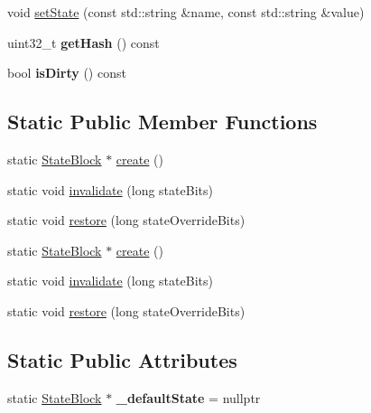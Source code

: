 \begin{DoxyCompactItemize}
\item 
void \hyperlink{classRenderState_1_1StateBlock_a2c2c0261c33ec94e36ec97d879179118}{set\+State} (const std\+::string \&name, const std\+::string \&value)
\item 
\mbox{\label{classRenderState_1_1StateBlock_ad1160751d0b0039ade6f575392c8a735}} 
uint32\+\_\+t {\bfseries get\+Hash} () const
\item 
\mbox{\label{classRenderState_1_1StateBlock_aac80240fe4044f00004ddaddaa14b68d}} 
bool {\bfseries is\+Dirty} () const
\end{DoxyCompactItemize}
\subsection*{Static Public Member Functions}
\begin{DoxyCompactItemize}
\item 
static \hyperlink{classRenderState_1_1StateBlock}{State\+Block} $\ast$ \hyperlink{classRenderState_1_1StateBlock_aa972f8dee9bea10f54006a4196adf632}{create} ()
\item 
static void \hyperlink{classRenderState_1_1StateBlock_a05ce75099029c8cc41f96328df911bd0}{invalidate} (long state\+Bits)
\item 
static void \hyperlink{classRenderState_1_1StateBlock_aa8ce56d1294d4afd7908fa6de4ea00d8}{restore} (long state\+Override\+Bits)
\item 
static \hyperlink{classRenderState_1_1StateBlock}{State\+Block} $\ast$ \hyperlink{classRenderState_1_1StateBlock_a0cde83688ecef4d80b19953503b34ea5}{create} ()
\item 
static void \hyperlink{classRenderState_1_1StateBlock_a777ec9909867662d30fd6f76bd18421c}{invalidate} (long state\+Bits)
\item 
static void \hyperlink{classRenderState_1_1StateBlock_afde47b2f8a831fa8655ae408017dd30d}{restore} (long state\+Override\+Bits)
\end{DoxyCompactItemize}
\subsection*{Static Public Attributes}
\begin{DoxyCompactItemize}
\item 
\mbox{\label{classRenderState_1_1StateBlock_adabf095ae48707f5496fd933d33aa586}} 
static \hyperlink{classRenderState_1_1StateBlock}{State\+Block} $\ast$ {\bfseries \+\_\+default\+State} = nullptr
\end{DoxyCompactItemize}
